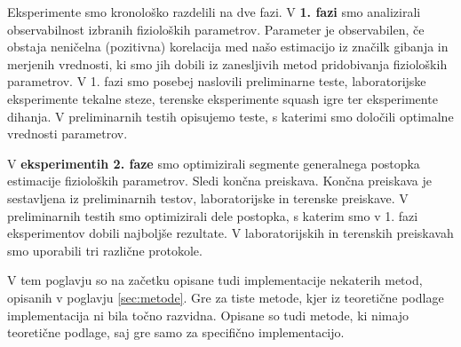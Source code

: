 Eksperimente smo kronološko razdelili na dve fazi. V \textbf{1. fazi} smo analizirali observabilnost izbranih fizioloških parametrov. Parameter je observabilen, če obstaja neničelna (pozitivna) korelacija med našo estimacijo iz značilk gibanja in merjenih vrednosti, ki smo jih dobili iz zanesljivih metod pridobivanja fizioloških parametrov. V 1. fazi smo posebej naslovili preliminarne teste, laboratorijske eksperimente tekalne steze, terenske eksperimente squash igre ter eksperimente dihanja. V {preliminarnih testih} opisujemo teste, s katerimi smo določili optimalne vrednosti parametrov. 

V \textbf{eksperimentih 2. faze} smo optimizirali segmente generalnega postopka estimacije fizioloških parametrov. Sledi končna preiskava. Končna preiskava je sestavljena iz preliminarnih testov, laboratorijske in terenske preiskave. V preliminarnih testih smo optimizirali dele postopka, s katerim smo v 1. fazi eksperimentov dobili najboljše rezultate. V laboratorijskih in terenskih preiskavah smo uporabili tri različne protokole.

V tem poglavju so na začetku opisane tudi implementacije nekaterih metod, opisanih v poglavju \ref{sec:metode}. Gre za tiste metode, kjer iz teoretične podlage implementacija ni bila točno razvidna. Opisane so tudi metode, ki nimajo teoretične podlage, saj gre samo za specifično implementacijo.


\renewcommand{\folder}{./pogl/03-eksperimenti}




